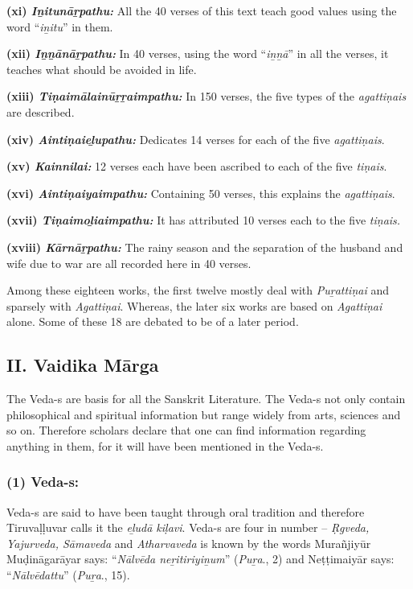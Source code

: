 \textbf{(xi) \textit{Iṉitunāṟpathu:}} All the 40 verses of this text teach good values using the word “\textit{iṉitu}” in them.

\textbf{(xii) \textit{Iṉṉānāṟpathu:}} In 40 verses, using the word “\textit{iṉṉā}” in all the verses, it teaches what should be avoided in life.

\textbf{(xiii) \textit{Tiṇaimālainūṟṟaimpathu:}} In 150 verses, the five types of the \textit{agattiṇais} are described.

\textbf{(xiv) \textit{Aintiṇaieḻupathu:}} Dedicates 14 verses for each of the five \textit{agattiṇais}.

\textbf{(xv) \textit{Kainnilai:}} 12 verses each have been ascribed to each of the five \textit{tiṇais}.

\textbf{(xvi) \textit{Aintiṇaiyaimpathu:}} Containing 50 verses, this explains the \textit{agattiṇais}.

\textbf{(xvii) \textit{Tiṇaimoḻiaimpathu:}} It has attributed 10 verses each to the five \textit{tiṇais.}

\textbf{(xviii) \textit{Kārnāṟpathu:}} The rainy season and the separation of the husband and wife due to war are all recorded here in 40 verses.

Among these eighteen works, the first twelve mostly deal with \textit{Puṟattiṇai} and sparsely with \textit{Agattiṇai}. Whereas, the later six works are based on \textit{Agattiṇai} alone. Some of these 18 are debated to be of a later period.


\subsection*{II. Vaidika Mārga}

\vskip -7pt

The Veda-s are basis for all the Sanskrit Literature. The Veda-s not only contain philosophical and spiritual information but range widely from arts, sciences and so on. Therefore scholars declare that one can find information regarding anything in them, for it will have been mentioned in the Veda-s.

\subsubsection*{(1) Veda-s:}

\vskip -7pt

Veda-s are said to have been taught through oral tradition and therefore Tiruvaḷḷuvar calls it the \textit{eḻudā kiḷavi}. Veda-s are four in number – \textit{Ṛgveda, Yajurveda, Sāmaveda} and \textit{Atharvaveda} is known by the words Murañjiyūr Muḍināgarāyar says: “\textit{Nālvēda neṟitiriyiṉum}” (\textit{Puṟa}., 2) and Neṭṭimaiyār says: “\textit{Nālvēdattu}” (\textit{Puṟa}., 15).

